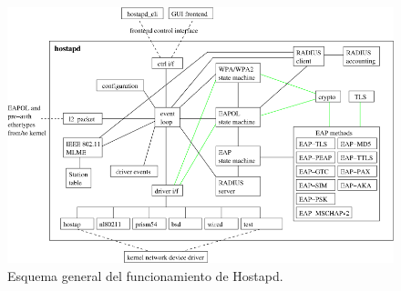 \begin{figure}[!t]
\begin{center}
\includegraphics[width=0.75\linewidth]{./3_Tecnologias/Img/hostapd.png}
\end{center}
\caption{Esquema general del funcionamiento de Hostapd.}
\label{hostapd}
\end{figure}

